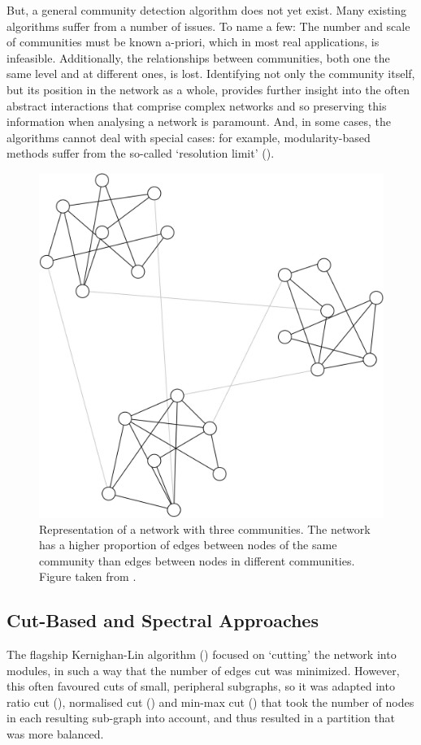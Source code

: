 \documentclass[
11pt, %
english, %
singlespacing, %
headsepline, %
]{MastersDoctoralThesis} %
\begin{document}
But, a general community detection algorithm does not yet exist.
Many existing algorithms suffer from a number of issues. 
To name a few:
The number and scale of communities must be known a-priori, which in most real applications, is infeasible.
Additionally, the relationships between communities, both one the same level and at different ones, is lost.
Identifying not only the community itself, but its position in the network as a whole, provides further insight into the often abstract interactions that comprise complex networks and so preserving this information when analysing a network is paramount.
And, in some cases, the algorithms cannot deal with special cases: for example, modularity-based methods suffer from the so-called `resolution limit' (\cite{fortunato2007resolution}).

\begin{figure}
	\centering
	\includegraphics[width=\textwidth]{figures/communities}
	\caption[Communities in a network]{Representation of a network with three communities. The network has a higher proportion of edges between nodes of the same community than edges between nodes in different communities. Figure taken from \cite{girvan2002community}.}
\end{figure}

\subsection{Cut-Based and Spectral Approaches}
The flagship Kernighan-Lin algorithm  (\cite{kernighan1970efficient}) focused on `cutting' the network into modules, in such a way that the number of edges cut was minimized. 
However, this often favoured cuts of small, peripheral subgraphs, so it was adapted into ratio cut (\cite{wei1991ratio}), normalised cut (\cite{shi2000normalized}) and min-max cut (\cite{ding2001min}) that took the number of nodes in each resulting sub-graph into account, and thus resulted in a partition that was more balanced.
\end{document}
